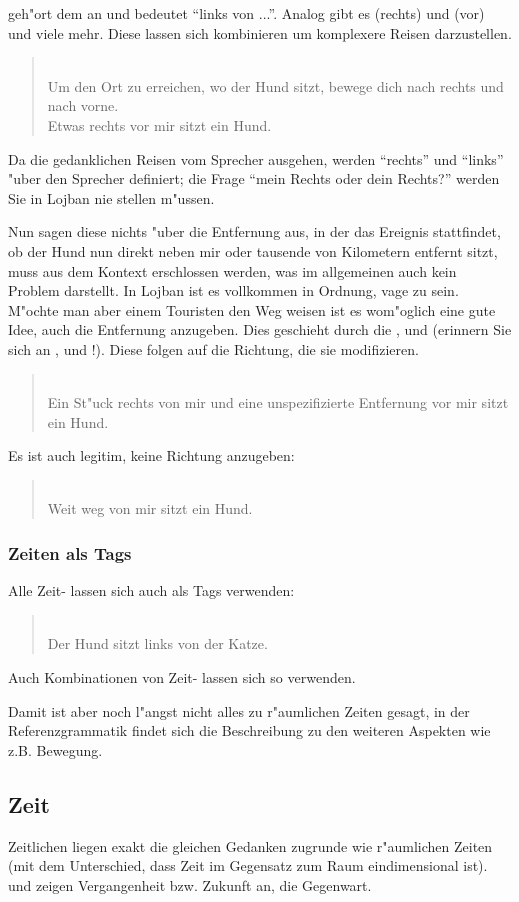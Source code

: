  geh"ort dem  an und bedeutet ``links von ...''. Analog gibt es  (rechts) und  (vor) und viele mehr.
Diese  lassen sich kombinieren um komplexere Reisen darzustellen.
\begin{quote}
 \\
Um den Ort zu erreichen, wo der Hund sitzt, bewege dich nach rechts und nach vorne. \\
Etwas rechts vor mir sitzt ein Hund.
\end{quote}
Da die gedanklichen Reisen vom Sprecher ausgehen, werden ``rechts'' und ``links'' "uber den Sprecher definiert; die Frage ``mein Rechts oder dein Rechts?'' werden Sie in Lojban nie stellen m"ussen.

Nun sagen diese  nichts "uber die Entfernung aus, in der das Ereignis stattfindet, ob der Hund nun direkt neben mir oder tausende von
Kilometern entfernt sitzt, muss aus dem Kontext erschlossen werden, was im allgemeinen auch kein Problem darstellt. In Lojban ist es vollkommen
in Ordnung, vage zu sein. M"ochte man aber einem Touristen den Weg weisen ist es wom"oglich eine gute Idee, auch die Entfernung anzugeben.
Dies geschieht durch die  ,  und  (erinnern Sie sich an ,  und !). Diese  folgen auf die Richtung, die sie modifizieren.

\begin{quote}
 \\
Ein St"uck rechts von mir und eine unspezifizierte Entfernung vor mir sitzt ein Hund.
\end{quote}

Es ist auch legitim, keine Richtung anzugeben:
\begin{quote}
 \\
Weit weg von mir sitzt ein Hund.
\end{quote}

\subsubsection{Zeiten als Tags}
Alle Zeit- lassen sich auch als Tags verwenden:
\begin{quote}
 \\
Der Hund sitzt links von der Katze.
\end{quote}
Auch Kombinationen von Zeit- lassen sich so verwenden.

Damit ist aber noch l"angst nicht alles zu r"aumlichen Zeiten gesagt, in der Referenzgrammatik findet sich die Beschreibung zu den weiteren
Aspekten wie z.B. Bewegung.

\subsection{Zeit}
Zeitlichen  liegen exakt die gleichen Gedanken zugrunde wie r"aumlichen Zeiten (mit dem Unterschied, dass Zeit im Gegensatz zum
Raum eindimensional ist).  und  zeigen Vergangenheit bzw. Zukunft an,  die Gegenwart.
